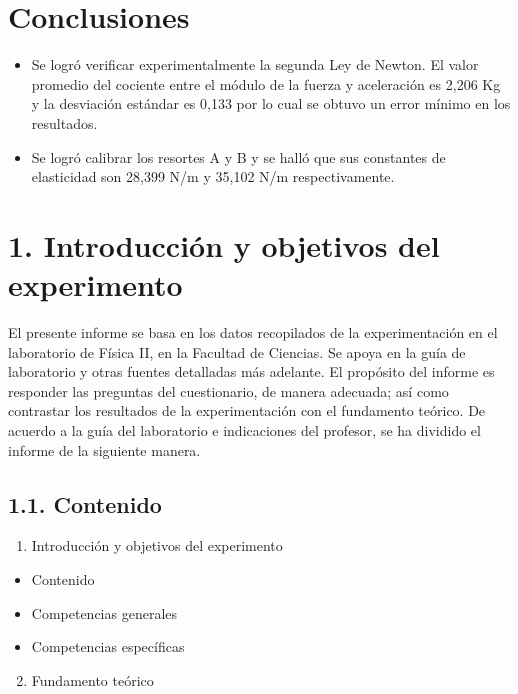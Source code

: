 \documentclass[10pt]{article}
\begin{document}
\section{Conclusiones}

\begin{itemize}
    \item Se logró verificar experimentalmente la segunda Ley de Newton. El valor promedio del cociente entre el módulo de la fuerza y aceleración es 2,206 Kg y la desviación estándar es 0,133 por lo cual se obtuvo un error mínimo en los resultados.
    \item Se logró calibrar los resortes A y B y se halló que sus constantes de elasticidad son 28,399 N/m y 35,102 N/m respectivamente.
\end{itemize}

\section*{1. Introducción y objetivos del experimento}
El presente informe se basa en los datos recopilados de la experimentación en el laboratorio de Física II, en la Facultad de Ciencias. Se apoya en la guía de laboratorio y otras fuentes detalladas más adelante. El propósito del informe es responder las preguntas del cuestionario, de manera adecuada; así como contrastar los resultados de la experimentación con el fundamento teórico. De acuerdo a la guía del laboratorio e indicaciones del profesor, se ha dividido el informe de la siguiente manera.

\subsection*{1.1. Contenido}
\begin{enumerate}
  \item Introducción y objetivos del experimento
\end{enumerate}

\begin{itemize}
  \item Contenido
  \item Competencias generales
  \item Competencias específicas
\end{itemize}

\begin{enumerate}
  \setcounter{enumi}{1}
  \item Fundamento teórico
\end{enumerate}
\end{document}
